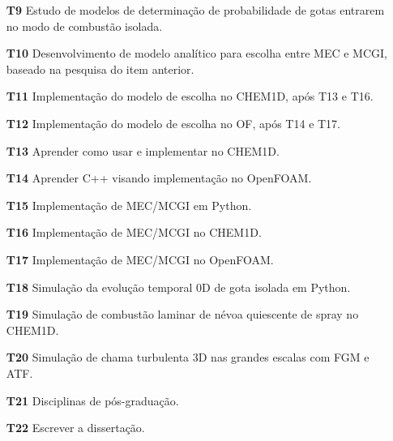 \begin{itemize}
    \item[\textbf{T9 }] Estudo de modelos de determinação de probabilidade de gotas entrarem no modo de combustão isolada.%
    \item[\textbf{T10}] Desenvolvimento de modelo analítico para escolha entre MEC e MCGI, baseado na pesquisa do item anterior.
    \item[\textbf{T11}] Implementação do modelo de escolha no CHEM1D, após T13 e T16.
    \item[\textbf{T12}] Implementação do modelo de escolha no OF, após T14 e T17.
    
    \item[\textbf{T13}] Aprender como usar e implementar no CHEM1D.
    \item[\textbf{T14}] Aprender C++ visando implementação no OpenFOAM.
    
    \item[\textbf{T15}] Implementação de MEC/MCGI em Python.%
    \item[\textbf{T16}] Implementação de MEC/MCGI no CHEM1D.%
    \item[\textbf{T17}] Implementação de MEC/MCGI no OpenFOAM.%
    
    \item[\textbf{T18}] Simulação da evolução temporal 0D de gota isolada em Python.           %
    \item[\textbf{T19}] Simulação de combustão laminar de névoa quiescente de spray no CHEM1D. %
    \item[\textbf{T20}] Simulação de chama turbulenta 3D nas grandes escalas com FGM e ATF.    %
    
    \item[\textbf{T21}] Disciplinas de pós-graduação.%
    \item[\textbf{T22}] Escrever a dissertação.%
\end{itemize}

